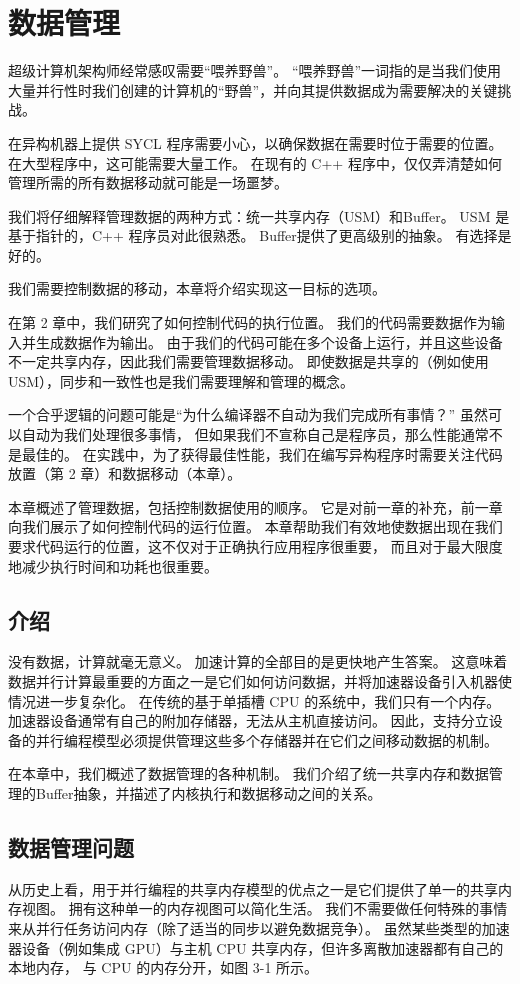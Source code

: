 \section{数据管理}
超级计算机架构师经常感叹需要“喂养野兽”。 
“喂养野兽”一词指的是当我们使用大量并行性时我们创建的计算机的“野兽”，并向其提供数据成为需要解决的关键挑战。

在异构机器上提供 SYCL 程序需要小心，以确保数据在需要时位于需要的位置。 
在大型程序中，这可能需要大量工作。 在现有的 C++ 程序中，仅仅弄清楚如何管理所需的所有数据移动就可能是一场噩梦。

我们将仔细解释管理数据的两种方式：统一共享内存（USM）和Buffer。 
USM 是基于指针的，C++ 程序员对此很熟悉。 Buffer提供了更高级别的抽象。 有选择是好的。

我们需要控制数据的移动，本章将介绍实现这一目标的选项。

在第 2 章中，我们研究了如何控制代码的执行位置。 我们的代码需要数据作为输入并生成数据作为输出。 
由于我们的代码可能在多个设备上运行，并且这些设备不一定共享内存，因此我们需要管理数据移动。 
即使数据是共享的（例如使用 USM），同步和一致性也是我们需要理解和管理的概念。

一个合乎逻辑的问题可能是“为什么编译器不自动为我们完成所有事情？” 虽然可以自动为我们处理很多事情，
但如果我们不宣称自己是程序员，那么性能通常不是最佳的。 
在实践中，为了获得最佳性能，我们在编写异构程序时需要关注代码放置（第 2 章）和数据移动（本章）。

本章概述了管理数据，包括控制数据使用的顺序。 它是对前一章的补充，前一章向我们展示了如何控制代码的运行位置。 
本章帮助我们有效地使数据出现在我们要求代码运行的位置，这不仅对于正确执行应用程序很重要，
而且对于最大限度地减少执行时间和功耗也很重要。


\subsection{介绍}
没有数据，计算就毫无意义。 加速计算的全部目的是更快地产生答案。 
这意味着数据并行计算最重要的方面之一是它们如何访问数据，并将加速器设备引入机器使情况进一步复杂化。 
在传统的基于单插槽 CPU 的系统中，我们只有一个内存。 加速器设备通常有自己的附加存储器，无法从主机直接访问。 
因此，支持分立设备的并行编程模型必须提供管理这些多个存储器并在它们之间移动数据的机制。

在本章中，我们概述了数据管理的各种机制。 
我们介绍了统一共享内存和数据管理的Buffer抽象，并描述了内核执行和数据移动之间的关系。

\subsection{数据管理问题}
从历史上看，用于并行编程的共享内存模型的优点之一是它们提供了单一的共享内存视图。 拥有这种单一的内存视图可以简化生活。 
我们不需要做任何特殊的事情来从并行任务访问内存（除了适当的同步以避免数据竞争）。 
虽然某些类型的加速器设备（例如集成 GPU）与主机 CPU 共享内存，但许多离散加速器都有自己的本地内存，
与 CPU 的内存分开，如图 3-1 所示。

